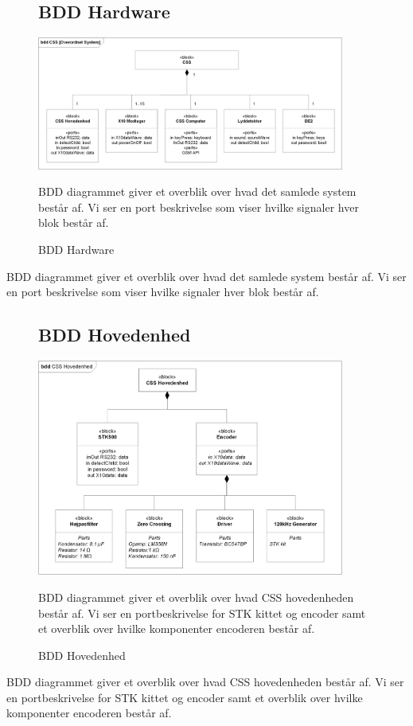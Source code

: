 \begin{figure}[!htbp] \centering
\subsection{BDD Hardware}
{\includegraphics[width=0.9\textwidth]{billeder/diagrammer/BDD_Hardware}}
\caption{BDD Hardware}
\label{lab:bddhardware}
\raggedright
BDD diagrammet giver et overblik over hvad det samlede system består af. Vi ser en port beskrivelse som viser hvilke signaler hver blok består af.
\end{figure}
BDD diagrammet giver et overblik over hvad det samlede system består af. Vi ser en port beskrivelse som viser hvilke signaler hver blok består af.

\begin{figure}[!htbp] \centering
\subsection{BDD Hovedenhed}
{\includegraphics[width=0.9\textwidth]{billeder/diagrammer/BDD_Hovedenhed}}
\caption{BDD Hovedenhed}
\label{lab:bddhovedenhed}
\raggedright
BDD diagrammet giver et overblik over hvad CSS hovedenheden består af. Vi ser en portbeskrivelse for STK kittet og encoder samt et overblik over hvilke komponenter encoderen består af.
\end{figure}
BDD diagrammet giver et overblik over hvad CSS hovedenheden består af. Vi ser en portbeskrivelse for STK kittet og encoder samt et overblik over hvilke komponenter encoderen består af. 

